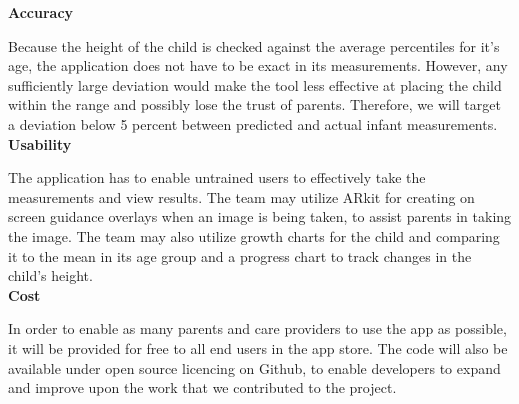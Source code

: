 \documentclass[10pt, draftclsnofoot, letterpaper, margin=.75in, onecolumn]{IEEEtran}
\begin{document}
\textbf{Accuracy}
\par Because the height of the child is checked against the average percentiles for it’s age, the application does not have to be exact in its measurements. However, any sufficiently large deviation would make the tool less effective at placing the child within the range and possibly lose the trust of parents. Therefore, we will target a deviation below 5 percent between predicted and actual infant measurements.\\

\textbf{Usability}
\par The application has to enable untrained users to effectively take the measurements and view results. The team may utilize ARkit for creating on screen guidance overlays when an image is being taken, to assist parents in taking the image. The team may also utilize growth charts for the child and comparing it to the mean in its age group and a  progress chart to track changes in the child's height.\\

\textbf{Cost}
\par In order to enable as many parents and care providers to use the app as possible, it will be provided for free to all end users in the app store.  The code will also be available under open source licencing on Github, to enable developers to expand and improve upon the work that we contributed to the project.\\




\end{document}
